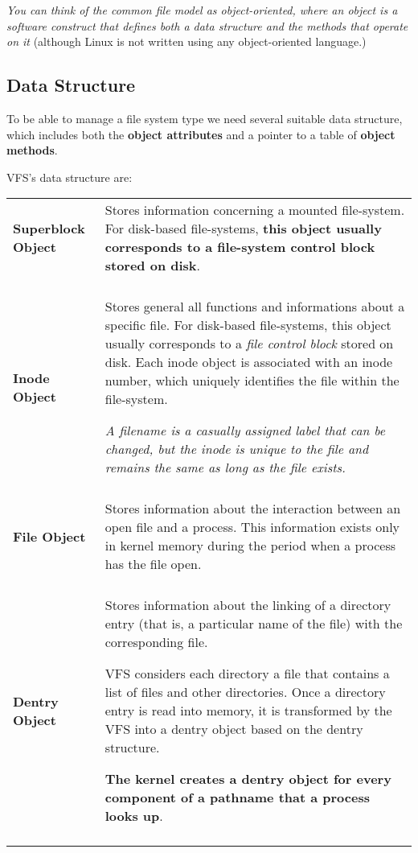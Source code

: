 \documentclass[10pt,a4paper]{article}
\begin{document}
\textit{You can think of the common file model as object-oriented, where an object is a software construct that defines both a data structure and the methods that operate on it} (although Linux is not written using any object-oriented language.)

\subsection{Data Structure}

To be able to manage a file system type we need several suitable data structure, which includes both the \textbf{object attributes} and a pointer to a table of \textbf{object methods}.

VFS's data structure are:

\begin{center}
\begin{tabular}{l|p{13cm}} 
\toprule
 
\textbf{Superblock Object} & Stores information concerning a mounted file-system. For disk-based file-systems, \textbf{this object usually corresponds to a file-system control block stored on disk}.\\\\

\textbf{Inode Object} & Stores general all functions and informations about a specific file. For disk-based file-systems, this
object usually corresponds to a \textit{file control block} stored on disk. Each inode object is associated with an inode number, which uniquely identifies the file within the file-system. 

\textit{A filename is a casually assigned label that can be changed, but the inode is unique to the file and remains the same as long as the file exists.} 

\\\\

\textbf{File Object} & Stores information about the interaction between an open file and a process.
This information exists only in kernel memory during the period when a process has the file open.

\\\\

\textbf{Dentry Object} & Stores information about the linking of a directory entry (that is, a particular
name of the file) with the corresponding file.

VFS considers each directory a file that contains a list of files and other directories. Once a directory entry is read into memory, it is transformed by the VFS into a dentry object based on the dentry structure.

\textbf{The kernel creates a dentry object for every component of a pathname that a process looks up}.
\\\\


\bottomrule
\end{tabular}
\end{center}
\end{document}
